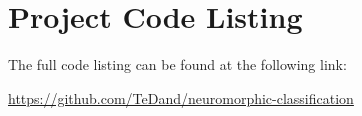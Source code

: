 \chapter{Project Code Listing}

The full code listing can be found at the following link:

\vspace{10pt}

\url{https://github.com/TeDand/neuromorphic-classification}